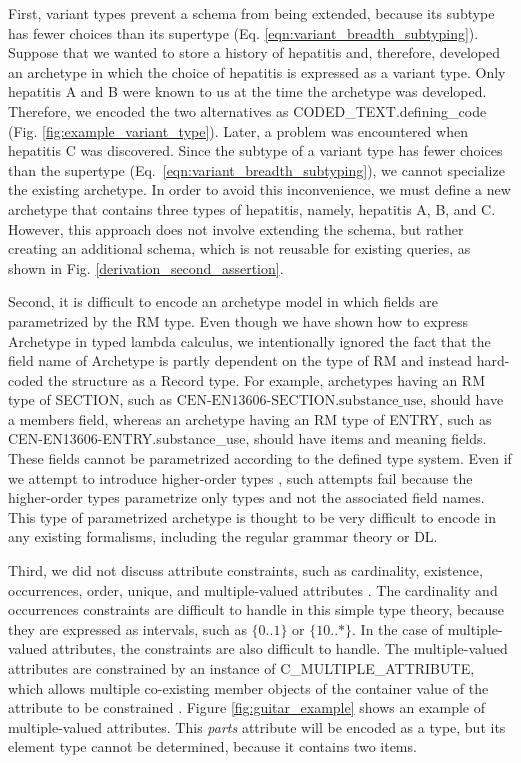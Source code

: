 \documentclass[preprint,3p,onecolumn,times,review]{article}
\begin{document}
{First, variant types prevent a schema from being extended, because its subtype has fewer choices than its supertype (Eq. \ref{eqn:variant_breadth_subtyping}). Suppose that we wanted to store a history of hepatitis and, therefore, developed an archetype in which the choice of hepatitis is expressed as a variant type. Only hepatitis A and B were known to us at the time the archetype was developed. Therefore, we encoded the two alternatives as CODED\_TEXT.defining\_code (Fig. \ref{fig:example_variant_type}). Later, a problem was encountered when hepatitis C was discovered. Since the subtype of a variant type has fewer choices than the supertype (Eq.~\ref{eqn:variant_breadth_subtyping}), we cannot specialize the existing archetype. In order to avoid this inconvenience, we must define a new archetype that contains three types of hepatitis, namely, hepatitis A, B, and C. However, this approach does not involve extending the schema, but rather creating an additional schema, which is not reusable for existing queries, as shown in Fig. \ref{derivation_second_assertion}.


Second, it is difficult to encode an archetype model in which fields are parametrized by the RM type. Even though we have shown how to express Archetype in typed lambda calculus, we intentionally ignored the fact that the field name of Archetype is partly dependent on the type of RM \cite[p.63]{iso08:13606_healt_elect_part2} and instead hard-coded the structure as a Record type. For example, archetypes having an RM type of SECTION, such as $\text{CEN-EN13606-SECTION.substance\_use}$, should have a members field, whereas an archetype having an RM type of ENTRY, such as CEN-EN13606-ENTRY.substance\_use, should have items and meaning fields. These fields cannot be parametrized according to the defined type system. Even if we attempt to introduce higher-order types \cite[p.24]{cardelli04:_type_system}, such attempts fail because the higher-order types parametrize only types and not the associated field names. This type of parametrized archetype is thought to be very difficult to encode in any existing formalisms, including the regular grammar theory or DL.

Third, we did not discuss attribute constraints, such as cardinality, existence, occurrences, order, unique, and multiple-valued attributes \cite[p.83-84]{iso08:13606_healt_elect_part2}.
The cardinality and occurrences constraints are difficult to handle in this simple type theory, because they are expressed as intervals, such as $\{0..1\}$ or $\{10..*\}$.
In the case of multiple-valued attributes, the constraints are also difficult to handle.
The multiple-valued attributes are constrained by an instance of C\_MULTIPLE\_ATTRIBUTE, which allows multiple
co-existing member objects of the container value of the attribute to be constrained \cite[x]{iso08:13606_healt_elect_part2}.
Figure \ref{fig:guitar_example} shows an example of multiple-valued attributes. This {\it{parts}} attribute will be encoded as a {} type, but its element type cannot be determined, because it contains two items.

}
\end{document}
